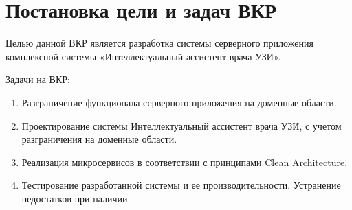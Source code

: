 \section{Постановка цели и задач ВКР}

Целью данной ВКР является разработка системы серверного приложения комплексной системы «Интеллектуальный ассистент врача УЗИ».


Задачи на ВКР:
\begin{enumerate}
    \item Разграничение функционала серверного приложения на доменные области.
    \item Проектирование системы Интеллектуальный ассистент врача УЗИ, с учетом разграничения на доменные области.
    \item Реализация микросервисов в соответствии с принципами Clean Architecture.
	\item Тестирование разработанной системы и ее производительности. Устранение недостатков при наличии.
\end{enumerate}




